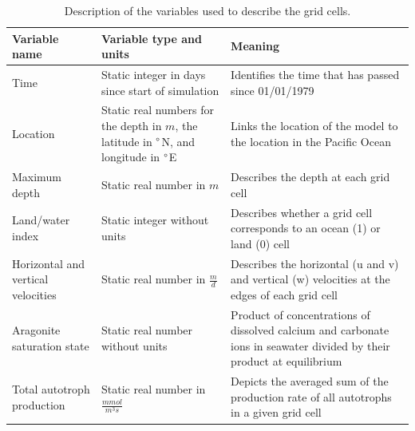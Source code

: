 \begin{table}[h!]
    
    \caption{Description of the variables used to describe the grid cells.}
    \label{tab:state_variables_cells}
    \scriptsize
    \centering
    \begin{tabulary}{\textwidth}{LLL}
    
        \hline
        \textbf{Variable name}                & \textbf{Variable type and units}                       & \textbf{Meaning}                                             \\ \hline
        Time                                   & Static integer in days since start of simulation                           & Identifies the time that has passed since 01/01/1979                          \\ \hline
        Location                            &  Static real numbers for the depth in $m$, the latitude in $\degree$N, and longitude in $\degree$E                           & Links the location of the model to the location in the Pacific Ocean                     \\ \hline
        Maximum depth                      & Static real number in $m$                         & Describes the depth at each grid cell         \\ \hline
        Land/water index                                 & Static integer without units                    & Describes whether a grid cell corresponds to an ocean (1) or land (0) cell                       \\ \hline
        Horizontal and vertical velocities                           & Static real number in $\frac{m}{d}$                       & Describes the horizontal (u and v) and vertical (w) velocities at the edges of each grid cell    \\ \hline
        Aragonite saturation state           & Static real number without units  & Product of concentrations of dissolved calcium and carbonate ions in seawater divided by their product at equilibrium  \\ \hline
        Total autotroph production    & Static real number in $\frac{mmol}{m^3s}$ & Depicts the averaged sum of the production rate of all autotrophs in a given grid cell \\ \hline
    \end{tabulary}
\end{table}

